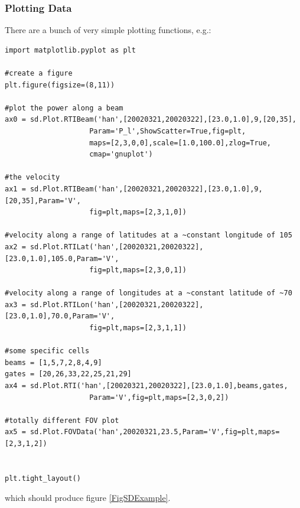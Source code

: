 			\subsubsection{Plotting Data}
			
				There are a bunch of very simple plotting functions, e.g.:
			
				\begin{verbatim}
import matplotlib.pyplot as plt
			
#create a figure
plt.figure(figsize=(8,11))
			
#plot the power along a beam
ax0 = sd.Plot.RTIBeam('han',[20020321,20020322],[23.0,1.0],9,[20,35],
					Param='P_l',ShowScatter=True,fig=plt,
					maps=[2,3,0,0],scale=[1.0,100.0],zlog=True,
					cmap='gnuplot')
			
#the velocity
ax1 = sd.Plot.RTIBeam('han',[20020321,20020322],[23.0,1.0],9,[20,35],Param='V',
					fig=plt,maps=[2,3,1,0])
			
#velocity along a range of latitudes at a ~constant longitude of 105
ax2 = sd.Plot.RTILat('han',[20020321,20020322],[23.0,1.0],105.0,Param='V',
					fig=plt,maps=[2,3,0,1])
		
#velocity along a range of longitudes at a ~constant latitude of ~70
ax3 = sd.Plot.RTILon('han',[20020321,20020322],[23.0,1.0],70.0,Param='V',
					fig=plt,maps=[2,3,1,1])
			
#some specific cells
beams = [1,5,7,2,8,4,9]
gates = [20,26,33,22,25,21,29]
ax4 = sd.Plot.RTI('han',[20020321,20020322],[23.0,1.0],beams,gates,
					Param='V',fig=plt,maps=[2,3,0,2])
			
#totally different FOV plot
ax5 = sd.Plot.FOVData('han',20020321,23.5,Param='V',fig=plt,maps=[2,3,1,2])
			
			
plt.tight_layout()
				\end{verbatim}
			
				which should produce figure \ref{FigSDExample}.
			
